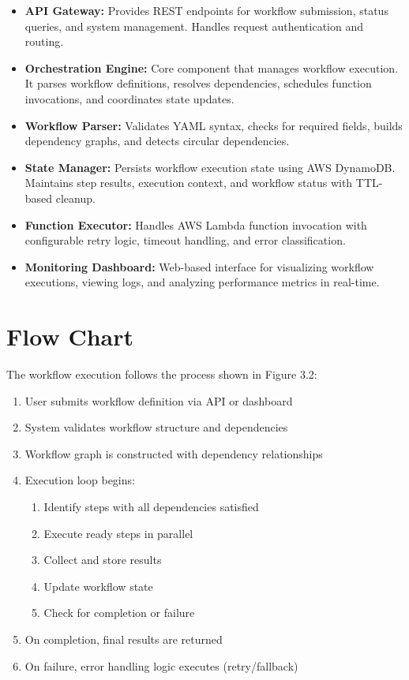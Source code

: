\documentclass{fisatprojectfinal}
\begin{document}
\begin{itemize}
    \item \textbf{API Gateway:} Provides REST endpoints for workflow submission, status queries, and system management. Handles request authentication and routing.
    
    \item \textbf{Orchestration Engine:} Core component that manages workflow execution. It parses workflow definitions, resolves dependencies, schedules function invocations, and coordinates state updates.
    
    \item \textbf{Workflow Parser:} Validates YAML syntax, checks for required fields, builds dependency graphs, and detects circular dependencies.
    
    \item \textbf{State Manager:} Persists workflow execution state using AWS DynamoDB. Maintains step results, execution context, and workflow status with TTL-based cleanup.
    
    \item \textbf{Function Executor:} Handles AWS Lambda function invocation with configurable retry logic, timeout handling, and error classification.
    
    \item \textbf{Monitoring Dashboard:} Web-based interface for visualizing workflow executions, viewing logs, and analyzing performance metrics in real-time.
\end{itemize}

\section{Flow Chart}
The workflow execution follows the process shown in Figure 3.2:

\begin{enumerate}
    \item User submits workflow definition via API or dashboard
    \item System validates workflow structure and dependencies
    \item Workflow graph is constructed with dependency relationships
    \item Execution loop begins:
    \begin{enumerate}
        \item Identify steps with all dependencies satisfied
        \item Execute ready steps in parallel
        \item Collect and store results
        \item Update workflow state
        \item Check for completion or failure
    \end{enumerate}
    \item On completion, final results are returned
    \item On failure, error handling logic executes (retry/fallback)
\end{enumerate}
\end{document}
